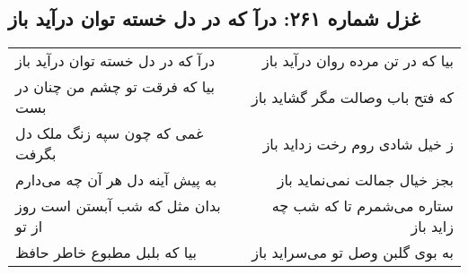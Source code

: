 \begin{center}
\section*{غزل شماره ۲۶۱: درآ که در دل خسته توان درآید باز}
\label{sec:sh261}
\begin{longtable}{l p{0.5cm} r}
درآ که در دل خسته توان درآید باز
&&
بیا که در تن مرده روان درآید باز
\\
بیا که فرقت تو چشم من چنان در بست
&&
که فتح باب وصالت مگر گشاید باز
\\
غمی که چون سپه زنگ ملک دل بگرفت
&&
ز خیل شادی روم رخت زداید باز
\\
به پیش آینه دل هر آن چه می‌دارم
&&
بجز خیال جمالت نمی‌نماید باز
\\
بدان مثل که شب آبستن است روز از تو
&&
ستاره می‌شمرم تا که شب چه زاید باز
\\
بیا که بلبل مطبوع خاطر حافظ
&&
به بوی گلبن وصل تو می‌سراید باز
\\
\end{longtable}
\end{center}

